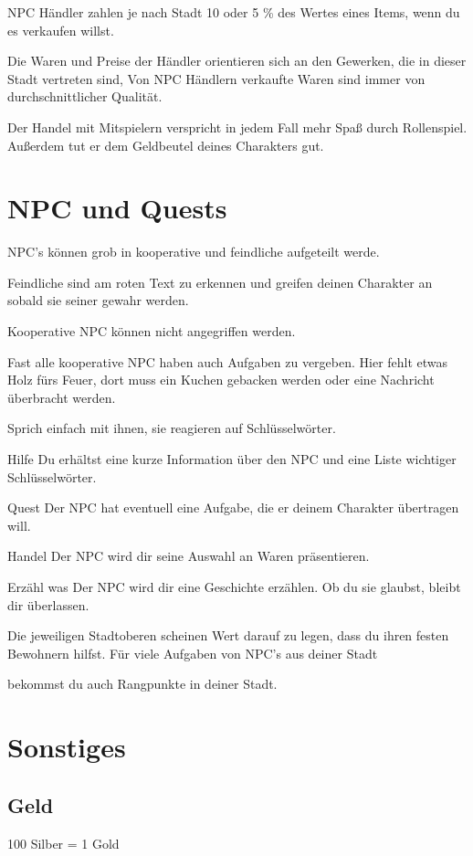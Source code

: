 \documentclass[a4paper,11pt]{book}
\begin{document}
NPC Händler zahlen je nach Stadt 10 oder 5 \% des Wertes eines Items, wenn du es verkaufen willst. 

Die Waren und Preise der Händler orientieren sich an den Gewerken, die in dieser Stadt vertreten sind, Von NPC Händlern verkaufte Waren sind immer von durchschnittlicher Qualität.

Der Handel mit Mitspielern verspricht in jedem Fall mehr Spaß durch Rollenspiel. Außerdem tut er dem Geldbeutel deines Charakters gut.

\section{NPC und Quests}

NPC’s können grob in kooperative und feindliche aufgeteilt werde.

Feindliche sind am roten Text zu erkennen und greifen deinen Charakter an sobald sie seiner gewahr werden.

Kooperative NPC können nicht angegriffen werden.

Fast alle kooperative NPC haben auch Aufgaben zu vergeben. Hier fehlt etwas Holz fürs Feuer, dort muss ein Kuchen gebacken werden oder eine Nachricht überbracht werden.

Sprich einfach mit ihnen, sie reagieren auf Schlüsselwörter.

Hilfe  Du erhältst eine kurze Information über den NPC und eine Liste wichtiger Schlüsselwörter.

Quest  Der NPC hat eventuell eine Aufgabe, die er deinem Charakter übertragen will.

Handel  Der NPC wird dir seine Auswahl an Waren präsentieren.

Erzähl was Der NPC wird dir eine Geschichte erzählen. Ob du sie glaubst, bleibt dir überlassen.

Die jeweiligen Stadtoberen scheinen Wert darauf zu legen, dass du ihren festen Bewohnern hilfst. Für viele Aufgaben von NPC’s aus deiner Stadt

bekommst du auch Rangpunkte in deiner Stadt.

\section{Sonstiges}

\subsection{Geld}
100 Silber = 1 Gold
\end{document}
